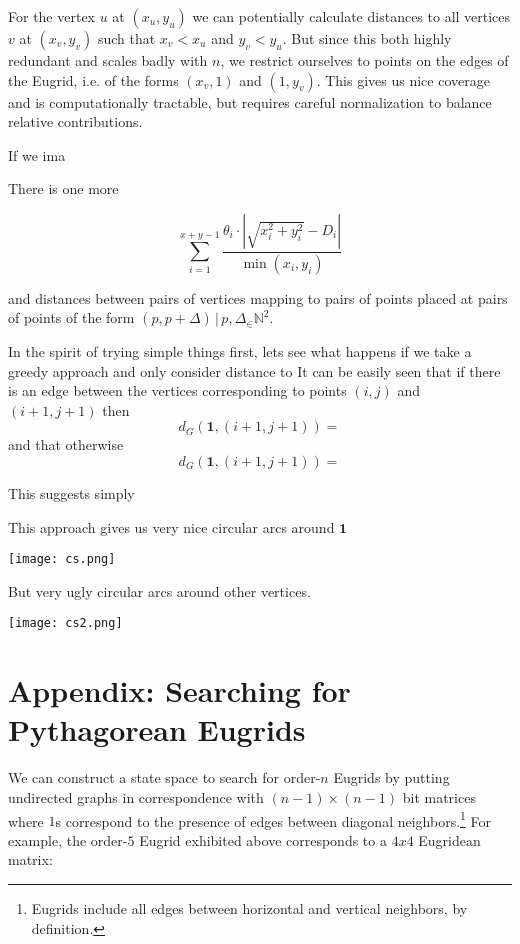 \documentclass[letterpaper]{article}
\begin{document}
For the vertex $u$ at $(x_u, y_u)$ we can potentially calculate distances to all vertices $v$
at $(x_v, y_v)$ such that $x_v < x_u$ and $y_v < y_u$. But since this both highly redundant
and scales badly with $n$, we restrict ourselves to points on the edges of the Eugrid, i.e.
of the forms $(x_v, 1)$ and $(1, y_v)$. This gives us nice coverage and is computationally
tractable, but requires careful normalization to balance relative contributions.

If we ima

There is one more

\begin{equation*}
\sum_{i=1}^{x+y-1} \frac{\theta_i \cdot |\sqrt{x_i^2 + y_i^2} - D_i|}{\min(x_i, y_i)}
\end{equation*}





and distances between pairs of vertices
mapping to pairs of points placed at pairs of points of the form $(p, p + \Delta) \, | \, p,
\Delta _\in \mathbb{N}^2$.

In the spirit of trying simple things first, lets see what happens if we take a greedy
approach and only consider distance to  It can be easily seen that
if there is an edge between the vertices corresponding to points $(i, j)$ and $(i + 1, j+1)$
then
\begin{equation}
  d_G(\mathbf{1}, (i+1, j+1)) =
\end{equation}
and that otherwise
\begin{equation}
  d_G(\mathbf{1}, (i+1, j+1)) =
\end{equation}

This suggests simply


This approach gives us very nice circular arcs around $\mathbf{1}$

\texttt{[image: cs.png]}

But very ugly circular arcs around other vertices.

\texttt{[image: cs2.png]}


\section*{Appendix: Searching for Pythagorean Eugrids}
\label{sec:appendix}

We can construct a state space to search for order-$n$ Eugrids by putting undirected graphs
in correspondence with $(n - 1) \times (n - 1)$ bit matrices where $1$s correspond to the
presence of edges between diagonal neighbors.\footnote{Eugrids include all edges between
horizontal and vertical neighbors, by definition.} For example, the order-$5$ Eugrid
exhibited above corresponds to a $4 x 4$ Eugridean matrix:
\end{document}
